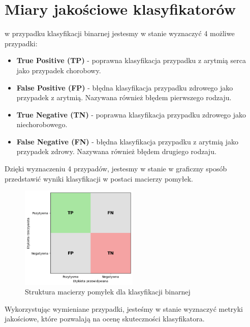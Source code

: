 \documentclass[a4paper,twoside,12pt]{book}
\begin{document}
\newpage
\section{Miary jakościowe klasyfikatorów}

w przypadku klasyfikacji binarnej jestesmy w stanie wyznaczyć 4 możliwe przypadki:
\begin{itemize}
	\item \textbf{True Positive (TP)} - poprawna klasyfikacja przypadku z arytmią serca jako przypadek chorobowy.
	\item \textbf{False Positive (FP)} - błędna klasyfikacja przypadku zdrowego jako przypadek z arytmią. Nazywana również błędem pierwszego rodzaju.
	\item \textbf{True Negative (TN)} - poprawna klasyfikacja przypadku zdrowego jako niechorobowego.
	\item \textbf{False Negative (FN)} - błędna klasyfikacja przypadku z arytmią jako przypadek zdrowy. Nazywana również błędem drugiego rodzaju.
\end{itemize}
Dzięki wyznaczeniu 4 przypadów, jestesmy w stanie w graficzny sposób przedstawić wyniki klasyfikacji w postaci macierzy pomyłek.

\begin{figure}[!h]
	\centering
	\includegraphics[width=0.5\textwidth]{img/r3/error_matrix.png}
	\caption{Struktura macierzy pomyłek dla klasyfikacji binarnej}
	\label{fig:etykieta-rysunku}
\end{figure}

Wykorzystując wymieniane przypadki, jesteśmy w stanie wyznaczyć metryki jakościowe, które pozwalają na ocenę skuteczności klasyfikatora.
\end{document}
